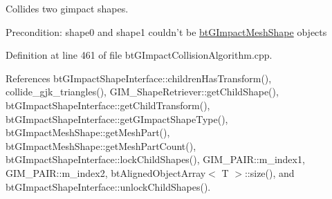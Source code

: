 Collides two gimpact shapes. 

\begin{Desc}
\item[Precondition:]shape0 and shape1 couldn't be \hyperlink{classbt_g_impact_mesh_shape}{btGImpactMeshShape} objects \end{Desc}


Definition at line 461 of file btGImpactCollisionAlgorithm.cpp.

References btGImpactShapeInterface::childrenHasTransform(), collide\_\-gjk\_\-triangles(), GIM\_\-ShapeRetriever::getChildShape(), btGImpactShapeInterface::getChildTransform(), btGImpactShapeInterface::getGImpactShapeType(), btGImpactMeshShape::getMeshPart(), btGImpactMeshShape::getMeshPartCount(), btGImpactShapeInterface::lockChildShapes(), GIM\_\-PAIR::m\_\-index1, GIM\_\-PAIR::m\_\-index2, btAlignedObjectArray$<$ T $>$::size(), and btGImpactShapeInterface::unlockChildShapes().

